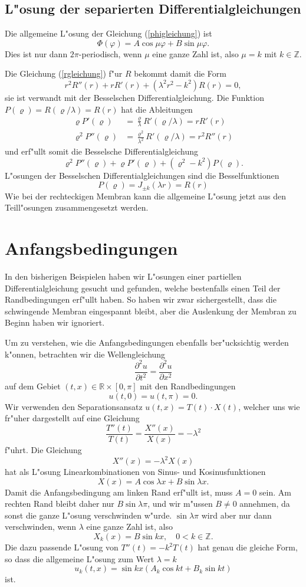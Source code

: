 \subsection{L"osung der separierten Differentialgleichungen}
Die allgemeine L"osung der Gleichung (\ref{phigleichung}) ist
\[
\Phi(\varphi)=A\cos\mu\varphi +B\sin\mu\varphi.
\]
Dies ist nur dann $2\pi$-periodisch, wenn $\mu$ eine ganze
Zahl ist, also $\mu=k$ mit $k\in\mathbb Z$.

Die Gleichung (\ref{rgleichung}) f"ur $R$ bekommt damit die Form
\[
r^2R''(r)+rR'(r)+(\lambda^2 r^2-k^2)R(r)=0,
\]
sie ist verwandt mit der Besselschen Differentialgleichung.
Die Funktion $P(\varrho)=R(\varrho/\lambda)=R(r)$ hat die Ableitungen
\begin{align*}
\varrho P'(\varrho)&=\frac{\varrho}{\lambda}R'(\varrho/\lambda)=rR'(r)\\
\varrho^2 P''(\varrho)&=\frac{\varrho^2}{\lambda^2}R'(\varrho/\lambda)=r^2R''(r)
\end{align*}
und erf"ullt somit die Besselsche Differentialgleichung
\[
\varrho^2P''(\varrho)+\varrho P'(\varrho)+(\varrho^2-k^2)P(\varrho).
\]
L"osungen der Besselschen Differentialgleichungen sind die Besselfunktionen
\[
P(\varrho)=J_{\pm k}(\lambda r)=R(r)
\]
Wie bei der rechteckigen Membran kann die allgemeine L"osung jetzt aus
den Teill"osungen zusammengesetzt werden.

\section{Anfangsbedingungen}
In den bisherigen Beispielen haben wir L"osungen einer partiellen
Differentialgleichung gesucht und gefunden, welche bestenfalls einen
Teil der Randbedingungen erf"ullt haben.
So haben wir zwar sichergestellt, dass die schwingende Membran eingespannt
bleibt, aber die Auslenkung der Membran zu Beginn haben wir ignoriert.

Um zu verstehen, wie die Anfangsbedingungen ebenfalls ber"ucksichtig
werden k"onnen, betrachten wir die Wellengleichung
\[
\frac{\partial^2 u}{\partial t^2}=\frac{\partial^2 u}{\partial x^2}
\]
auf dem Gebiet $(t,x)\in\mathbb R\times [0,\pi]$
mit den Randbedingungen
\[
u(t,0)=u(t,\pi)=0.
\]
Wir verwenden den Separationsansatz
$u(t,x)=T(t)\cdot X(t)$, welcher uns wie fr"uher dargestellt auf eine
Gleichung
\[
\frac{T''(t)}{T(t)}=\frac{X''(x)}{X(x)}=-\lambda^2
\]
f"uhrt.
Die Gleichung 
\[
X''(x)=-\lambda^2 X(x)
\]
hat als L"osung Linearkombinationen von Sinus- und Kosinusfunktionen
\[
X(x)=A\cos\lambda x+B\sin\lambda x.
\]
Damit die Anfangsbedingung am linken Rand erf"ullt ist, muss $A=0$
sein. Am rechten Rand bleibt daher nur $B\sin\lambda \pi$, und wir
m"ussen $B\ne 0$ annehmen, da sonst die ganze L"osung verschwinden
w"urde. $\sin\lambda \pi$ wird aber nur dann verschwinden, wenn
$\lambda$ eine ganze Zahl ist, also
\[
X_k(x)=B\sin kx, \quad 0<k\in\mathbb Z.
\]
Die dazu passende L"osung von $T''(t)=-k^2T(t)$ hat genau die
gleiche Form, so dass die allgemeine L"osung zum Wert $\lambda=k$
\[
u_k(t,x)=\sin kx\left(A_k\cos kt+B_k\sin kt\right)
\]
ist.

